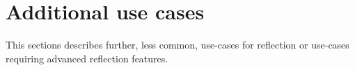 \section{Additional use cases}
\label{appendix-other-use-cases}

This sections describes further, less common, use-cases for reflection or use-cases
requiring advanced reflection features.






